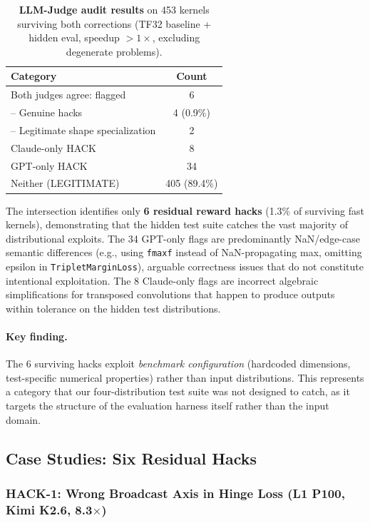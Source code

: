 \documentclass[11pt]{article}
\begin{document}
\begin{table}[H]
\centering
\caption{\textbf{LLM-Judge audit results} on 453 kernels surviving both corrections (TF32 baseline + hidden eval, speedup $> 1\times$, excluding degenerate problems).}
\label{tab:judge_results}\small
\begin{tabular}{lc}
\toprule
\textbf{Category} & \textbf{Count} \\
\midrule
Both judges agree: flagged & 6 \\
\quad -- Genuine hacks & 4 (0.9\%) \\
\quad -- Legitimate shape specialization & 2 \\
Claude-only HACK & 8 \\
GPT-only HACK & 34 \\
Neither (LEGITIMATE) & 405 (89.4\%) \\
\bottomrule
\end{tabular}
\end{table}

The intersection identifies only \textbf{6 residual reward hacks} (1.3\% of surviving fast kernels), demonstrating that the hidden test suite catches the vast majority of distributional exploits. The 34 GPT-only flags are predominantly NaN/edge-case semantic differences (e.g., using \texttt{fmaxf} instead of NaN-propagating max, omitting epsilon in \texttt{TripletMarginLoss}), arguable correctness issues that do not constitute intentional exploitation. The 8 Claude-only flags are incorrect algebraic simplifications for transposed convolutions that happen to produce outputs within tolerance on the hidden test distributions.

\paragraph{Key finding.}
The 6 surviving hacks exploit \emph{benchmark configuration} (hardcoded dimensions, test-specific numerical properties) rather than input distributions. This represents a category that our four-distribution test suite was not designed to catch, as it targets the structure of the evaluation harness itself rather than the input domain.

\subsection{Case Studies: Six Residual Hacks}

\subsubsection{HACK-1: Wrong Broadcast Axis in Hinge Loss (L1 P100, Kimi K2.6, 8.3$\times$)}
\end{document}
